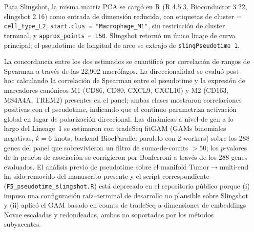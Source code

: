 \documentclass[12pt,a4paper]{article}
\begin{document}
Para Slingshot, la misma matriz PCA se cargó en R (R 4.5.3, Bioconductor 3.22, slingshot 2.16) como entrada de dimensión reducida, con etiquetas de cluster = \texttt{cell\_type\_L2}, \texttt{start.clus = "Macrophage\_M1"}, sin restricción de cluster terminal, y \texttt{approx\_points = 150}. Slingshot retornó un único linaje de curva principal; el pseudotime de longitud de arco se extrajo de \texttt{slingPseudotime\_1}.

La concordancia entre los dos estimados se cuantificó por correlación de rangos de Spearman a través de las 22,902 macrófagos. La direccionalidad se evaluó post-hoc calculando la correlación de Spearman entre el pseudotime y la expresión de marcadores canónicos M1 (CD86, CD80, CXCL9, CXCL10) y M2 (CD163, MS4A4A, TREM2) presentes en el panel; ambas clases mostraron correlaciones positivas con el pseudotime, indicando que el continuo parametriza activación global en lugar de polarización direccional. Las dinámicas a nivel de gen a lo largo del Lineage~1 se estimaron con tradeSeq \citep{vandenberge2020tradeseq} fitGAM (GAMs binomiales negativas, $k = 6$ knots, backend BiocParallel paralelo con 2 workers) sobre los 288 genes del panel que sobrevivieron un filtro de suma-de-counts $> 50$; los $p$-valores de la prueba de asociación se corrigieron por Bonferroni a través de los 288 genes evaluados. El análisis previo de pseudotime sobre el manifold Tumor$\to$multi-end ha sido removido del manuscrito presente y el script correspondiente (\texttt{F5\_pseudotime\_slingshot.R}) está deprecado en el repositorio público porque (i) impuso una configuración raíz--terminal de desarrollo no plausible sobre Slingshot y (ii) aplicó el GAM basado en counts de tradeSeq a dimensiones de embeddings Novae escaladas y redondeadas, ambas no soportadas por los métodos subyacentes.
\end{document}
